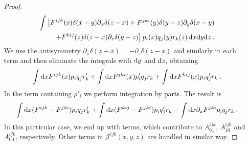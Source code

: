 \begin{proof}
    \begin{align}
        \int \big[ F^{ijk}(x) \delta(x-y) \partial_x \delta(z-x) 
        + F^{jki}(y) \delta(y-z) \partial_y \delta(x-y) \nonumber \\
        + F^{kij}(z) \delta(z-x) \partial_z \delta(y-z) \big] \,
        p_i(x) q_j(y) r_k(z) \,\mathrm{d} x \mathrm{d} y \mathrm{d} z \:.
    \end{align}
    We use the antisymmetry $
        \partial_x \delta(z-x) = - \partial_z \delta (z-x)$
    and similarly in each term and then eliminate the integrals with $\mathrm{d} y$ and $\mathrm{d} z$, obtaining
    \begin{align}
        \int \mathrm{d} x F^{ijk}(x) p_i q_j r'_k + \int \mathrm{d} x F^{jki}(x)  p'_i q_j r_k +
        \int \mathrm{d} x F^{kij}(x) p_i q'_j r_k \:.
    \end{align}
    In the term containing $p'_i$ we perform integration by parts. The result is
    \begin{align}
        \int \mathrm{d} x (F^{ijk}-F^{jki}) p_i q_j  r'_k +
        \int \mathrm{d} x (F^{kij}-F^{jki}) p_i q'_j r_k -
        \int \mathrm{d} x \partial_x F^{jki} p_i q_j r_k \:.
    \end{align}
    In this particular case, we end up with terms, which contribute to $A^{ijk}_{01}$, $A^{ijk}_{10}$ and $A^{ijk}_{00}$, respectively. Other terms in $\mathcal J^{ijk}(x,y,z)$ are handled in similar way.


\end{proof}
